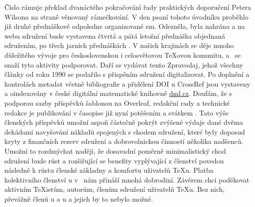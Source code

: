 Číslo rámuje překlad dvanáctého pokračování řady praktických doporučení Petera Wilsona  na straně  věnovaný rámečkování.
V den psaní tohoto úvodníku proběhlo již druhé přednáškové odpoledne organizované \CSTUG em. Odezněla, byla nahrána a na webu sdružení bude vystavena čtvrtá a pátá letošní přednáška \cite{cstug2022valna} objednaná sdružením, po třech jarních přednáškách \cite{cstug2021valna}.  V našich krajinách se děje mnoho důležitého vývoje pro československou i celosvětovou \TeX ovou komunitu, a \CSTUG\ se snaží tyto aktivity podporovat.
Daří se vydávat tento Zpravodaj, jehož všechny články od roku 1990 se podařilo s přispěním sdružení digitalizovat.  Po doplnění a kontrolách metadat včetně bibliografie a přidělení DOI u CrossRef jsou vystaveny a oindexovány v české digitální matematické knihovně \href{https://dml.cz}{dml.cz}.  Doufám, že s podporou sazby příspěvků šablonou na Overleaf, redakční rady a technické redakce je publikování v časopise již nyní potěšením a svátkem \smiley.  
Tato výše členských příspěvků umožní aspoň částečně pokrýt zvýšené výdaje dané dvěma dekádami navyšování nákladů spojených s chodem sdružení, které byly doposud kryty z finančních rezerv sdružení a dobrovolnickou činností několika nadšenců.  Umožní to rozdmýchat naději, že dosavadní poměrně minimalistický chod sdružení bude růst a rozšiřující se benefity vyplývající z členství povedou následně k růstu členské základny a komfortu uživatelů \TeX u.
Platba kolektivního členství \CSTUG u v \TUG\ nám přináší mnohá dobrodiní.
Závěrem chci poděkovat aktivním \TeX istům, autorům, členům sdružení uživatelů \TeX u.  Bez nich, převážně členů \CSTUG u a \TUG u a jejich  by to nebylo možné.
